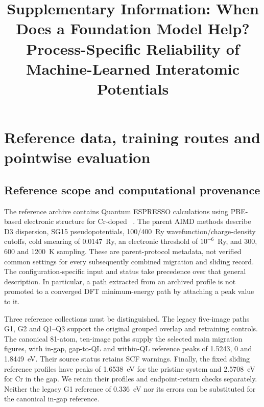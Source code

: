 \documentclass[pdflatex,sn-mathphys-num]{sn-jnl}
\begin{document}
\title[Supplementary Information]{Supplementary Information: When Does a Foundation Model Help? Process-Specific Reliability of Machine-Learned Interatomic Potentials}
\author[1]{ }
\author[1]{ }
\author*[1]{ }
\maketitle

\section{Reference data, training routes and pointwise evaluation}\label{sec:reference}
\subsection{Reference scope and computational provenance}
The reference archive contains Quantum ESPRESSO calculations using PBE-based electronic structure for Cr-doped ~\citep{giannozzi2009quantum,perdew1996generalized}. The parent AIMD methods describe D3 dispersion, SG15 pseudopotentials, 100/400~Ry wavefunction/charge-density cutoffs, cold smearing of 0.0147~Ry, an electronic threshold of $10^{-6}$~Ry, and 300, 600 and 1200~K sampling. These are parent-protocol metadata, not verified common settings for every subsequently combined migration and sliding record. The configuration-specific input and status take precedence over that general description. In particular, a path extracted from an archived profile is not promoted to a converged DFT minimum-energy path by attaching a peak value to it.

Three reference collections must be distinguished. The legacy five-image paths G1, G2 and Q1--Q3 support the original grouped overlap and retraining controls. The canonical 81-atom, ten-image paths supply the selected main migration figures, with in-gap, gap-to-QL and within-QL reference peaks of 1.5243, 0 and 1.8449~eV. Their source status retains SCF warnings. Finally, the fixed sliding reference profiles have peaks of 1.6538~eV for the pristine system and 2.5708~eV for Cr in the gap. We retain their profiles and endpoint-return checks separately. Neither the legacy G1 reference of 0.336~eV nor its errors can be substituted for the canonical in-gap reference.
\end{document}
